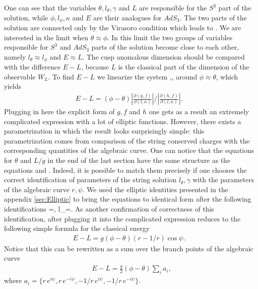 One can see that the variables $\theta,l_{\theta},\gamma$ and $L$ are responsible for the $S^3$ part of the solution, while  $\phi,l_{\phi},\kappa$ and $E$ are their analogues for $AdS_3$. The two parts of the solution are connected only by the Virasoro condition which leads to .
We are interested in the limit when $\theta\approx\phi$. In this limit the two groups of variables responsible for $S^3$ and $AdS_3$ parts of the solution become close to each other, namely $l_{\theta}\approx l_{\phi}$ and $E\approx L$. The cusp anomalous dimension should be compared with the difference $E-L$, because $L$ is the classical part of the dimension of the observable $W_L$. To find $E-L$ we linearize the system ,, around $\phi\approx\theta$, which yields
\begin{align}
E-L=(\phi-\theta)\left|\frac{\partial{(g,f)}}{\partial{(l,\kappa)}}\right|/\left|\frac{\partial{(h,f)}}{\partial{(l,\kappa)}}\right|.
\label{eq:ELbig}
\end{align}
Plugging in here the explicit form of $g,f$ and $h$ one gets as a result an extremely complicated expression with a lot of elliptic functions. However, there exists a parametrization in which the result looks surprisingly simple: this parametrization comes from comparison of the string conserved charges with the corresponding quantities of the algebraic curve. One can notice that the equations for $\theta$ and $L/g$ in the end of the last section have the same structure as the equations  and . Indeed, it is possible to match them precisely if one chooses the correct identification of parameters of the string solution $l_\theta,\gamma$ with the parameters of the algebraic curve $r,\psi$. We used the elliptic identities presented in the appendix \ref{sec:Elliptic} to bring the equations to identical form after the following identifications
\beq
\gamma=,\; l_{\theta}=.
\label{eq:identification}
\eeq
As another confirmation of correctness of this identification, after plugging it into  the complicated expression reduces to the following simple formula for the classical energy
\begin{align}
E-L=g(\phi-\theta)(r-1/r)\cos\psi.
\label{eq:E1}
\end{align}
Notice that this can be rewritten as a sum over the branch points of the algebraic curve
\begin{align}
&E-L=\frac{g}{2}(\phi-\theta)\sum\limits_i a_i,
\end{align}
where $a_i=\{r \, e^{i\psi}, r \, e^{-i\psi},-1/r \, e^{i\psi},-1/r \, e^{-i\psi}\}$.


